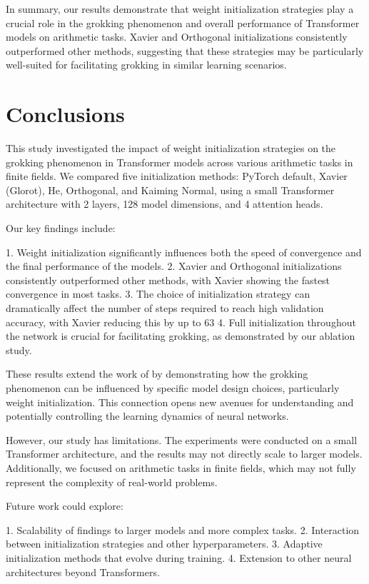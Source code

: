 \documentclass{article} %
\begin{document}
In summary, our results demonstrate that weight initialization strategies play a crucial role in the grokking phenomenon and overall performance of Transformer models on arithmetic tasks. Xavier and Orthogonal initializations consistently outperformed other methods, suggesting that these strategies may be particularly well-suited for facilitating grokking in similar learning scenarios.

\section{Conclusions}
\label{sec:conclusion}

This study investigated the impact of weight initialization strategies on the grokking phenomenon in Transformer models across various arithmetic tasks in finite fields. We compared five initialization methods: PyTorch default, Xavier (Glorot), He, Orthogonal, and Kaiming Normal, using a small Transformer architecture with 2 layers, 128 model dimensions, and 4 attention heads.

Our key findings include:

1. Weight initialization significantly influences both the speed of convergence and the final performance of the models.
2. Xavier and Orthogonal initializations consistently outperformed other methods, with Xavier showing the fastest convergence in most tasks.
3. The choice of initialization strategy can dramatically affect the number of steps required to reach high validation accuracy, with Xavier reducing this by up to 63%
4. Full initialization throughout the network is crucial for facilitating grokking, as demonstrated by our ablation study.

These results extend the work of \citet{power2022grokking} by demonstrating how the grokking phenomenon can be influenced by specific model design choices, particularly weight initialization. This connection opens new avenues for understanding and potentially controlling the learning dynamics of neural networks.

However, our study has limitations. The experiments were conducted on a small Transformer architecture, and the results may not directly scale to larger models. Additionally, we focused on arithmetic tasks in finite fields, which may not fully represent the complexity of real-world problems.

Future work could explore:

1. Scalability of findings to larger models and more complex tasks.
2. Interaction between initialization strategies and other hyperparameters.
3. Adaptive initialization methods that evolve during training.
4. Extension to other neural architectures beyond Transformers.
\end{document}
